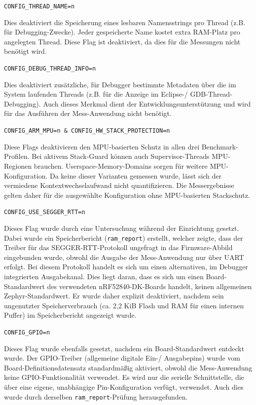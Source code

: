 \lstinline[style=fileinline]|CONFIG_THREAD_NAME=n|

Dies deaktiviert die Speicherung eines lesbaren Namensstrings pro Thread (z.B. für Debugging-Zwecke). Jeder gespeicherte Name kostet extra RAM-Platz pro angelegten Thread. Diese Flag ist deaktiviert, da dies für die Messungen nicht benötigt wird.

\lstinline[style=fileinline]|CONFIG_DEBUG_THREAD_INFO=n|

Dies deaktiviert zusätzliche, für Debugger bestimmte Metadaten über die im System laufenden Threads (z.B. für die Anzeige im Eclipse-/ GDB-Thread-Debugging). Auch dieses Merkmal dient der Entwicklungsunterstützung und wird für das Ausführen der Mess-Anwendung nicht benötigt.

\lstinline[style=fileinline]|CONFIG_ARM_MPU=n & CONFIG_HW_STACK_PROTECTION=n|

Diese Flags deaktivieren den MPU-basierten Schutz in allen drei Benchmark-Profilen. Bei aktivem Stack-Guard können auch Supervisor-Threads MPU-Regionen brauchen. Userspace-Memory-Domains sorgen für weitere MPU-Konfiguration. Da keine dieser Varianten gemessen wurde, lässt sich der vermiedene Kontextwechselaufwand nicht quantifizieren. Die Messergebnisse gelten daher für die ausgewählte Konfiguration ohne MPU-basierten Stackschutz.

\lstinline[style=fileinline]|CONFIG_USE_SEGGER_RTT=n|

Dieses Flag wurde durch eine Untersuchung während der Einrichtung gesetzt. Dabei wurde ein Speicherbericht (\lstinline[style=fileinline]|ram_report|) erstellt, welcher zeigte, dass der Treiber für das SEGGER-RTT-Protokoll ungefragt in das Firmware-Abbild eingebunden wurde, obwohl die Ausgabe der Mess-Anwendung nur über UART erfolgt. Bei diesem Protokoll handelt es sich um einen alternativen, im Debugger integrierten Ausgabekanal. Dies liegt daran, dass es sich um einen Board-Standardwert des verwendeten nRF52840-DK-Boards handelt, keinen allgemeinen Zephyr-Standardwert. Er wurde daher explizit deaktiviert, nachdem sein ungenutzter Speicherverbrauch (ca. 2,2 KiB Flash und RAM für einen internen Puffer) im Speicherbericht angezeigt wurde.

\lstinline[style=fileinline]|CONFIG_GPIO=n|

Dieses Flag wurde ebenfalls gesetzt, nachdem ein Board-Standardwert entdeckt wurde. Der GPIO-Treiber (allgemeine digitale Ein-/ Ausgabepins) wurde vom Board-Definitionsdatensatz standardmäßig aktiviert, obwohl die Mess-Anwendung keine GPIO-Funktionalität verwendet. Es wird nur die serielle Schnittstelle, die über eine eigene, unabhängige Pin-Konfiguration verfügt, verwendet. Auch dies wurde durch derselben \lstinline[style=fileinline]|ram_report|-Prüfung herausgefunden.

